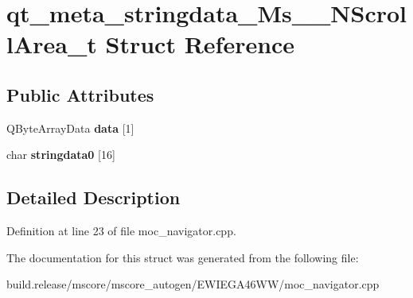 \hypertarget{structqt__meta__stringdata___ms_____n_scroll_area__t}{}\section{qt\+\_\+meta\+\_\+stringdata\+\_\+\+Ms\+\_\+\+\_\+\+N\+Scroll\+Area\+\_\+t Struct Reference}
\label{structqt__meta__stringdata___ms_____n_scroll_area__t}
\subsection*{Public Attributes}
\begin{DoxyCompactItemize}
\item 
\mbox{\label{structqt__meta__stringdata___ms_____n_scroll_area__t_a8fb92fb1264dad58ac39367bbb59d072}} 
Q\+Byte\+Array\+Data {\bfseries data} \mbox{[}1\mbox{]}
\item 
\mbox{\label{structqt__meta__stringdata___ms_____n_scroll_area__t_aa0dc73a2a6a239c79a1795c5cb569b8e}} 
char {\bfseries stringdata0} \mbox{[}16\mbox{]}
\end{DoxyCompactItemize}


\subsection{Detailed Description}


Definition at line 23 of file moc\+\_\+navigator.\+cpp.



The documentation for this struct was generated from the following file\+:\begin{DoxyCompactItemize}
\item 
build.\+release/mscore/mscore\+\_\+autogen/\+E\+W\+I\+E\+G\+A46\+W\+W/moc\+\_\+navigator.\+cpp\end{DoxyCompactItemize}
